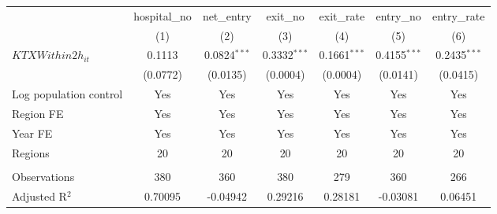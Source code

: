 \begingroup
\centering
\begin{tabular}{lcccccc}
   \toprule
                          & hospital\_no  & net\_entry     & exit\_no       & exit\_rate     & entry\_no      & entry\_rate \\    
                          & (1)           & (2)            & (3)            & (4)            & (5)            & (6)\\  
   \midrule 
   $KTXWithin2h_{it}$     & 0.1113        & 0.0824$^{***}$ & 0.3332$^{***}$ & 0.1661$^{***}$ & 0.4155$^{***}$ & 0.2435$^{***}$\\   
                          & (0.0772)      & (0.0135)       & (0.0004)       & (0.0004)       & (0.0141)       & (0.0415)\\   
   Log population control & Yes           & Yes            & Yes            & Yes            & Yes            & Yes\\  
   Region FE              & Yes           & Yes            & Yes            & Yes            & Yes            & Yes\\  
   Year FE                & Yes           & Yes            & Yes            & Yes            & Yes            & Yes\\  
   Regions                & 20            & 20             & 20             & 20             & 20             & 20\\  
    \\
   Observations           & 380           & 360            & 380            & 279            & 360            & 266\\  
   Adjusted R$^2$         & 0.70095       & -0.04942       & 0.29216        & 0.28181        & -0.03081       & 0.06451\\  
   \bottomrule
\end{tabular}
\par\endgroup
